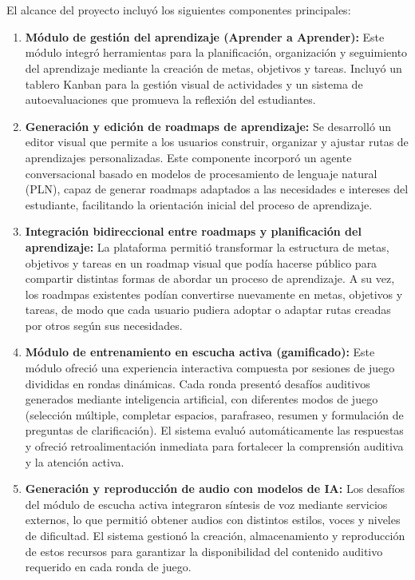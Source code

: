 \\
\\
El alcance del proyecto incluyó los siguientes componentes principales:
\begin{enumerate}
    \item \textbf{Módulo de gestión del aprendizaje (Aprender a Aprender):}
    Este módulo integró herramientas para la planificación, organización y seguimiento del aprendizaje mediante la creación de metas, objetivos y tareas. Incluyó un tablero Kanban para la gestión visual de actividades y un sistema de autoevaluaciones que promueva la reflexión del estudiantes. 

    \item \textbf{Generación y edición de roadmaps de aprendizaje:}
    Se desarrolló un editor visual que permite a los usuarios construir, organizar y ajustar rutas de aprendizajes personalizadas. Este componente incorporó un agente conversacional basado en modelos de procesamiento de lenguaje natural (PLN), capaz de generar roadmaps adaptados a las necesidades e intereses del estudiante, facilitando la orientación inicial del proceso de aprendizaje.

    \item \textbf{Integración bidireccional entre roadmaps y planificación del aprendizaje:}
    La plataforma permitió transformar la estructura de metas, objetivos y tareas en un roadmap visual que podía hacerse público para compartir distintas formas de abordar un proceso de aprendizaje. A su vez, los roadmpas existentes podían convertirse nuevamente en metas, objetivos y tareas, de modo que cada usuario pudiera adoptar o adaptar rutas creadas por otros según sus necesidades.

    \item \textbf{Módulo de entrenamiento en escucha activa (gamificado):}
    Este módulo ofreció una experiencia interactiva compuesta por sesiones de juego divididas en rondas dinámicas. Cada ronda presentó desafíos auditivos generados mediante inteligencia artificial, con diferentes modos de juego (selección múltiple, completar espacios, parafraseo, resumen y formulación de preguntas de clarificación). El sistema evaluó automáticamente las respuestas y ofreció retroalimentación inmediata para fortalecer la comprensión auditiva y la atención activa.

    \item \textbf{Generación y reproducción de audio con modelos de IA:}
    Los desafíos del módulo de escucha activa integraron síntesis de voz mediante servicios externos, lo que permitió obtener audios con distintos estilos, voces y niveles de dificultad. El sistema gestionó la creación, almacenamiento y reproducción de estos recursos para garantizar la disponibilidad del contenido auditivo requerido en cada ronda de juego.
\end{enumerate}
